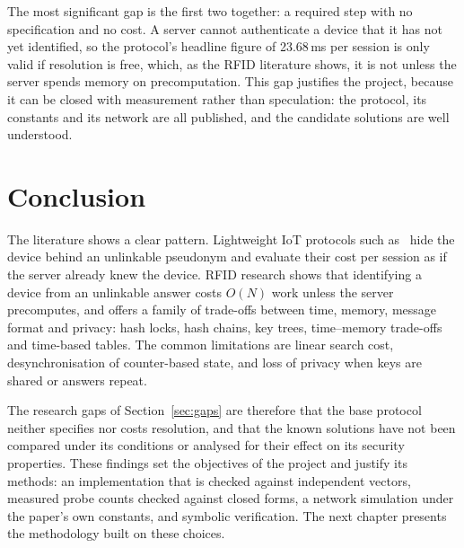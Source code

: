 The most significant gap is the first two together: a required step with no specification and no cost. A server cannot authenticate a device that it has not yet identified, so the protocol's headline figure of 23.68\,ms per session is only valid if resolution is free, which, as the RFID literature shows, it is not unless the server spends memory on precomputation. This gap justifies the project, because it can be closed with measurement rather than speculation: the protocol, its constants and its network are all published, and the candidate solutions are well understood.

\section{Conclusion}
The literature shows a clear pattern. Lightweight IoT protocols such as~\cite{base} hide the device behind an unlinkable pseudonym and evaluate their cost per session as if the server already knew the device. RFID research shows that identifying a device from an unlinkable answer costs $O(N)$ work unless the server precomputes, and offers a family of trade-offs between time, memory, message format and privacy: hash locks, hash chains, key trees, time--memory trade-offs and time-based tables. The common limitations are linear search cost, desynchronisation of counter-based state, and loss of privacy when keys are shared or answers repeat.

The research gaps of Section~\ref{sec:gaps} are therefore that the base protocol neither specifies nor costs resolution, and that the known solutions have not been compared under its conditions or analysed for their effect on its security properties. These findings set the objectives of the project and justify its methods: an implementation that is checked against independent vectors, measured probe counts checked against closed forms, a network simulation under the paper's own constants, and symbolic verification. The next chapter presents the methodology built on these choices.
